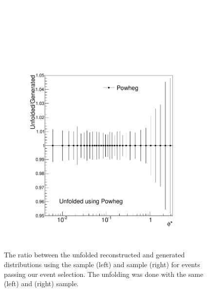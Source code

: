 \begin{figure}[!htbp]
\begin{subfigure}[b]{\SideBySidePlotWidth}
        \caption{}
        \label{fig:unfolding_madgraph_with_madgraph}
    \end{subfigure}%
    \begin{subfigure}[b]{\SideBySidePlotWidth}
        \includegraphics[width=\textwidth]{figures/BinM_PP.pdf}
        \caption{}
        \label{fig:unfolding_powheg_with_powheg}
    \end{subfigure}
    \caption[
        The ratio of unfolded reconstructed over generated \phistar in MC.
    ]{
        The ratio between the unfolded reconstructed and generated \phistar
        distributions using the \MADGRAPH sample (left) and \POWHEG sample
        (right) for events passing our event selection. The unfolding was done
        with the same \MADGRAPH (left) and \POWHEG (right) sample.
    }
    \label{fig:unfolded_vs_true_in_mc}
\end{figure}


